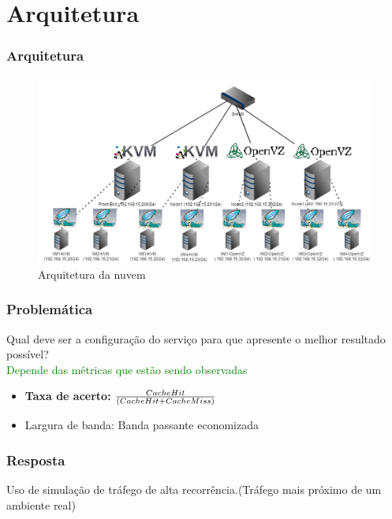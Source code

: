 \documentclass{beamer}
\begin{document}
    \section{Arquitetura}
    \begin{frame}
     \frametitle{Arquitetura}
     \begin{figure}
      \centering
      \includegraphics[scale=0.4]{imagens/arquiteturanuvem.png}
      \caption{Arquitetura da nuvem}
     \end{figure}
    \end{frame}

    \begin{frame}
     \frametitle{Problemática}     
     Qual deve ser a configuração do serviço para que apresente o melhor resultado possível?\\
     \textcolor{green}{Depende das métricas que estão sendo observadas}
    \begin{itemize}
     \item \textbf{Taxa de acerto:} ${Cache Hit\over(Cache Hit + Cache Miss)}$
     \item Largura de banda: Banda passante economizada
    \end{itemize}
    \end{frame}

    \begin{frame}
      \frametitle{Resposta}
      \huge{Uso de simulação de tráfego de alta recorrência.(Tráfego mais próximo de um ambiente real)}
    \end{frame}
\end{document}
